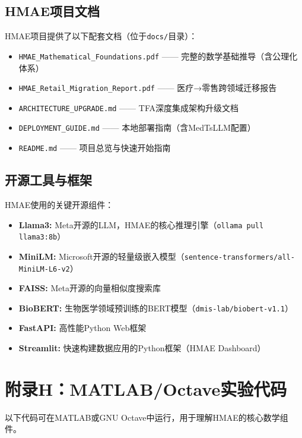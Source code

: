 \documentclass[11pt,a4paper]{ctexart}
\begin{document}
\subsection*{HMAE项目文档}

HMAE项目提供了以下配套文档（位于\texttt{docs/}目录）：
\begin{itemize}[nosep]
\item \texttt{HMAE\_Mathematical\_Foundations.pdf} —— 完整的数学基础推导（含公理化体系）
\item \texttt{HMAE\_Retail\_Migration\_Report.pdf} —— 医疗→零售跨领域迁移报告
\item \texttt{ARCHITECTURE\_UPGRADE.md} —— TFA深度集成架构升级文档
\item \texttt{DEPLOYMENT\_GUIDE.md} —— 本地部署指南（含MedTsLLM配置）
\item \texttt{README.md} —— 项目总览与快速开始指南
\end{itemize}

\subsection*{开源工具与框架}

HMAE使用的关键开源组件：
\begin{itemize}[nosep]
\item \textbf{Llama3:} Meta开源的LLM，HMAE的核心推理引擎（\texttt{ollama pull llama3:8b}）
\item \textbf{MiniLM:} Microsoft开源的轻量级嵌入模型（\texttt{sentence-transformers/all-MiniLM-L6-v2}）
\item \textbf{FAISS:} Meta开源的向量相似度搜索库
\item \textbf{BioBERT:} 生物医学领域预训练的BERT模型（\texttt{dmis-lab/biobert-v1.1}）
\item \textbf{FastAPI:} 高性能Python Web框架
\item \textbf{Streamlit:} 快速构建数据应用的Python框架（HMAE Dashboard）
\end{itemize}

\newpage


\newpage

\section*{附录H：MATLAB/Octave实验代码}

以下代码可在MATLAB或GNU Octave中运行，用于理解HMAE的核心数学组件。
\end{document}

